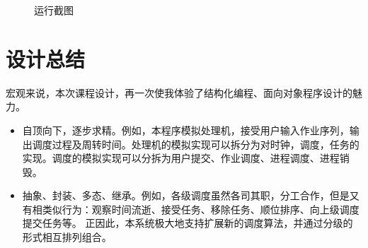 \documentclass[UTF8]{ctexart}
\begin{document}
\begin{figure}[h]
    \centering
    \caption{运行截图}
\end{figure}

\section{设计总结}

宏观来说，本次课程设计，再一次使我体验了结构化编程、面向对象程序设计的魅力。
\begin{itemize}
    \item 自顶向下，逐步求精。例如，本程序模拟处理机，接受用户输入作业序列，输出调度过程及周转时间。处理机的模拟实现可以拆分为对时钟，调度，任务的实现。调度的模拟实现可以分拆为用户提交、作业调度、进程调度、进程销毁。
    \item 抽象、封装、多态、继承。例如，各级调度虽然各司其职，分工合作，但是又有相类似行为：观察时间流逝、接受任务、移除任务、顺位排序、向上级调度提交任务等。
          正因此，本系统极大地支持扩展新的调度算法，并通过分级的形式相互排列组合。
\end{itemize}
\end{document}
